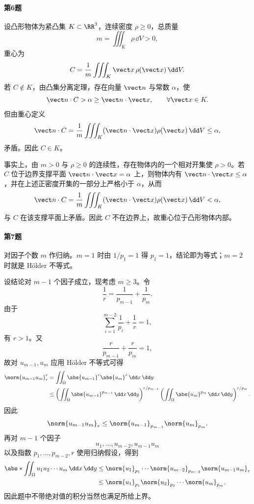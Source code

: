 \paragraph{第6题}
\begin{xsolution}
设凸形物体为紧凸集 $K\subset\RR^3$，连续密度 $\rho\ge0$，总质量
\[
 m=\iiint_K\rho\,\dd V>0,
\]
重心为
\[
 C=\frac1m\iiint_K\vect x\,\rho(\vect x)\,\dd V.
\]
若 $C\notin K$，由凸集分离定理，存在向量 $\vect n$ 与常数 $\alpha$，使
\[
 \vect n\cdot C>\alpha\ge\vect n\cdot\vect x,
 \qquad\forall\vect x\in K.
\]
但由重心定义
\[
 \vect n\cdot C
 =\frac1m\iiint_K(\vect n\cdot\vect x)\rho(\vect x)\,\dd V
 \le\alpha,
\]
矛盾。因此 $C\in K$。

事实上，由 $m>0$ 与 $\rho\ge0$ 的连续性，存在物体内的一个相对开集使 $\rho>0$。若 $C$ 位于边界支撑平面 $\vect n\cdot\vect x=\alpha$ 上，则物体内有 $\vect n\cdot\vect x\le\alpha$，并在上述正密度开集的一部分上严格小于 $\alpha$，从而
\[
  \vect n\cdot C
  =\frac1m\iiint_K(\vect n\cdot\vect x)\rho(\vect x)\,\dd V<\alpha,
\]
与 $C$ 在该支撑平面上矛盾。因此 $C$ 不在边界上，故重心位于凸形物体内部。
\end{xsolution}

\paragraph{第7题}
\begin{xsolution}
对因子个数 $m$ 作归纳。$m=1$ 时由 $1/p_1=1$ 得 $p_1=1$，结论即为等式；$m=2$ 时就是 Hölder 不等式。

设结论对 $m-1$ 个因子成立，现考虑 $m\ge3$。令
\[
 \frac1r=\frac1{p_{m-1}}+\frac1{p_m}.
\]
由于
\[
 \sum_{i=1}^{m-2}\frac1{p_i}+\frac1r=1,
\]
有 $r>1$。又
\[
 \frac{r}{p_{m-1}}+\frac{r}{p_m}=1,
\]
故对 $u_{m-1},u_m$ 应用 Hölder 不等式可得
\begin{align*}
 \norm{u_{m-1}u_m}_r^r
 &=\iint_\Omega\abs{u_{m-1}}^r\abs{u_m}^r\,\dd x\,\dd y\\
 &\le
 \left(\iint_\Omega\abs{u_{m-1}}^{p_{m-1}}\,\dd x\,\dd y\right)^{r/p_{m-1}}
 \left(\iint_\Omega\abs{u_m}^{p_m}\,\dd x\,\dd y\right)^{r/p_m}.
\end{align*}
因此
\[
 \norm{u_{m-1}u_m}_r
 \le\norm{u_{m-1}}_{p_{m-1}}\norm{u_m}_{p_m}.
\]
再对 $m-1$ 个因子
\[
 u_1,\ldots,u_{m-2},u_{m-1}u_m
\]
以及指数 $p_1,\ldots,p_{m-2},r$ 使用归纳假设，得到
\begin{align*}
 \abs*{\iint_\Omega u_1u_2\cdots u_m\,\dd x\,\dd y}
 &\le\norm{u_1}_{p_1}\cdots\norm{u_{m-2}}_{p_{m-2}}
 \norm{u_{m-1}u_m}_r\\
 &\le\norm{u_1}_{p_1}\norm{u_2}_{p_2}\cdots\norm{u_m}_{p_m}.
\end{align*}
因此题中不带绝对值的积分当然也满足所给上界。
\end{xsolution}

